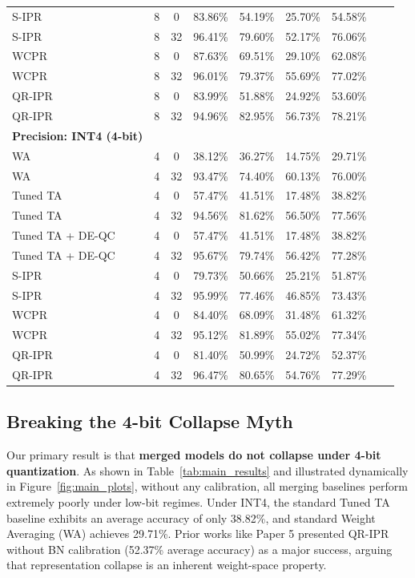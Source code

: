 \documentclass{article}
\theoremstyle{plain}
\theoremstyle{definition}
\theoremstyle{remark}
\begin{document}
\begin{table}[t]
\begin{center}
\begin{small}
\begin{sc}
\begin{tabular}{lcccccccc}
S-IPR & 8 & 0 & 83.86\% & 54.19\% & 25.70\% & 54.58\% \\
S-IPR & 8 & 32 & 96.41\% & 79.60\% & 52.17\% & 76.06\% \\
WCPR & 8 & 0 & 87.63\% & 69.51\% & 29.10\% & 62.08\% \\
WCPR & 8 & 32 & 96.01\% & 79.37\% & 55.69\% & 77.02\% \\
QR-IPR & 8 & 0 & 83.99\% & 51.88\% & 24.92\% & 53.60\% \\
QR-IPR & 8 & 32 & 94.96\% & 82.95\% & 56.73\% & 78.21\% \\
\midrule
\textbf{Precision: INT4 (4-bit)} & & & & & & \\
WA & 4 & 0 & 38.12\% & 36.27\% & 14.75\% & 29.71\% \\
WA & 4 & 32 & 93.47\% & 74.40\% & 60.13\% & 76.00\% \\
Tuned TA & 4 & 0 & 57.47\% & 41.51\% & 17.48\% & 38.82\% \\
Tuned TA & 4 & 32 & 94.56\% & 81.62\% & 56.50\% & 77.56\% \\
Tuned TA + DE-QC & 4 & 0 & 57.47\% & 41.51\% & 17.48\% & 38.82\% \\
Tuned TA + DE-QC & 4 & 32 & 95.67\% & 79.74\% & 56.42\% & 77.28\% \\
S-IPR & 4 & 0 & 79.73\% & 50.66\% & 25.21\% & 51.87\% \\
S-IPR & 4 & 32 & 95.99\% & 77.46\% & 46.85\% & 73.43\% \\
WCPR & 4 & 0 & 84.40\% & 68.09\% & 31.48\% & 61.32\% \\
WCPR & 4 & 32 & 95.12\% & 81.89\% & 55.02\% & 77.34\% \\
QR-IPR & 4 & 0 & 81.40\% & 50.99\% & 24.72\% & 52.37\% \\
QR-IPR & 4 & 32 & 96.47\% & 80.65\% & 54.76\% & 77.29\% \\
\bottomrule
\end{tabular}
\end{sc}
\end{small}
\end{center}
\end{table}

\subsection{Breaking the 4-bit Collapse Myth}
Our primary result is that \textbf{merged models do not collapse under 4-bit quantization}.
As shown in Table~\ref{tab:main_results} and illustrated dynamically in Figure~\ref{fig:main_plots}, without any calibration, all merging baselines perform extremely poorly under low-bit regimes. Under INT4, the standard Tuned TA baseline exhibits an average accuracy of only 38.82\%, and standard Weight Averaging (WA) achieves 29.71\%. 
Prior works like Paper 5 \cite{paper5} presented QR-IPR without BN calibration (52.37\% average accuracy) as a major success, arguing that representation collapse is an inherent weight-space property.
\end{document}
